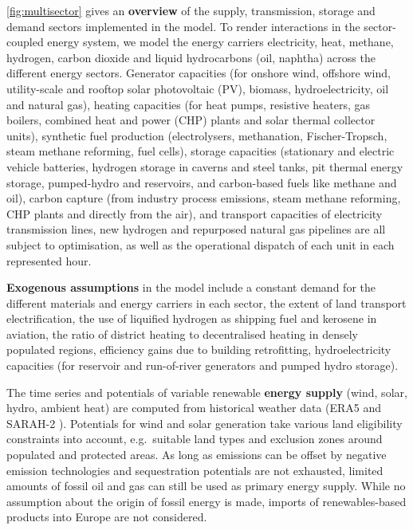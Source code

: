 \cref{fig:multisector} gives an \textbf{overview} of the supply, transmission,
storage and demand sectors implemented in the model. To render interactions in
the sector-coupled energy system, we model the energy carriers electricity,
heat, methane, hydrogen, carbon dioxide and liquid hydrocarbons (oil, naphtha)
across the different energy sectors. Generator capacities (for onshore wind,
offshore wind, utility-scale and rooftop solar photovoltaic (PV), biomass,
hydroelectricity, oil and natural gas), heating capacities (for heat pumps,
resistive heaters, gas boilers, combined heat and power (CHP) plants and solar
thermal collector units), synthetic fuel production (electrolysers, methanation,
Fischer-Tropsch, steam methane reforming, fuel cells), storage capacities
(stationary and electric vehicle batteries, hydrogen storage in caverns and
steel tanks, pit thermal energy storage, pumped-hydro and reservoirs, and
carbon-based fuels like methane and oil), carbon capture (from industry process
emissions, steam methane reforming, CHP plants and directly from the air), and
transport capacities of electricity transmission lines, new hydrogen and
repurposed natural gas pipelines are all subject to optimisation, as well as the
operational dispatch of each unit in each represented hour.

\textbf{Exogenous assumptions} in the model include a constant demand for the
different materials and energy carriers in each sector, the extent of land
transport electrification, the use of liquified hydrogen as shipping fuel and
kerosene in aviation, the ratio of district heating to decentralised heating in
densely populated regions, efficiency gains due to building retrofitting,
hydroelectricity capacities (for reservoir and run-of-river generators and
pumped hydro storage).

The time series and potentials of variable renewable \textbf{energy supply}
(wind, solar, hydro, ambient heat) are computed from historical weather data
(ERA5 \cite{ecmwf} and SARAH-2 \cite{SARAH}). Potentials for wind and solar
generation take various land eligibility constraints into account, e.g.~suitable
land types and exclusion zones around populated and protected areas. As long as
emissions can be offset by negative emission technologies and sequestration
potentials are not exhausted, limited amounts of fossil oil and gas can still be
used as primary energy supply. While no assumption about the origin of fossil
energy is made, imports of renewables-based products into Europe are not
considered.


